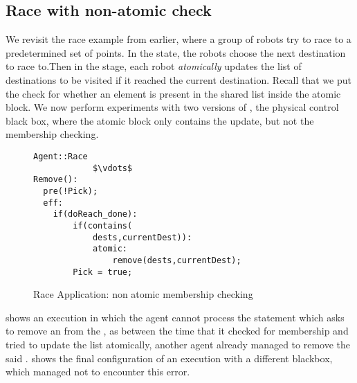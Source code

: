 \subsection{Race with non-atomic check}
We revisit the race example from earlier, where a group of robots try to race to a predetermined set of points. In the  state, the robots choose the next destination to race to.Then in the  stage, each robot \emph{atomically} updates the list of destinations to be visited if it reached the current destination. Recall that we put the check for whether an element is present in the shared list  inside the atomic block. We now perform experiments with two versions of , the physical control black box, where the atomic block only contains the update, but not the membership checking.  

\begin{figure}[ht!]
\label{fig:Race}
\noindent\begin{minipage}{.5\textwidth}

\begin{lstlisting}[mathescape = true]
Agent::Race      
			$\vdots$ 
Remove():
  pre(!Pick);
  eff:
    if(doReach_done):
    	if(contains(
    	    dests,currentDest)):
            atomic:
        		remove(dests,currentDest);
    	Pick = true;
 \end{lstlisting}
 \end{minipage}\hfill
 \caption{Race Application: non atomic membership checking}
 \end{figure}



 shows an execution in which the agent cannot process the statement which asks to remove an  from the , as between the time that it checked for membership and tried to update the list atomically, another agent already managed to remove the said .  shows the final configuration of an execution with a different blackbox, which managed not to encounter this error. 
